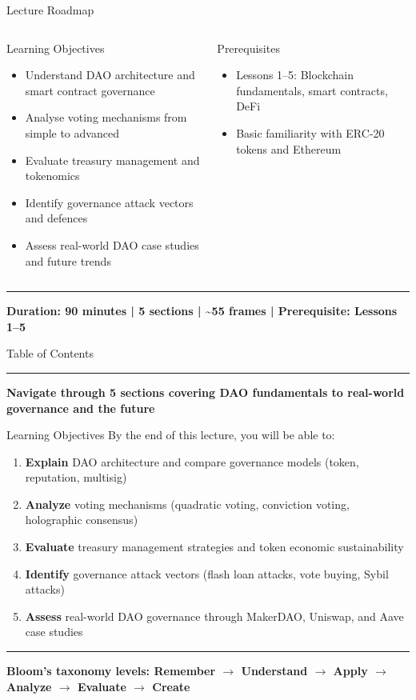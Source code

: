 \documentclass[8pt,aspectratio=169]{beamer}
\newcommand{\bottomnote}[1]{\vfill\vspace{-2mm}\textcolor{mllavender2}{\rule{\textwidth}{0.4pt}}\vspace{1mm}\footnotesize\textbf{#1}}
\begin{document}
\begin{frame}{Lecture Roadmap}
\begin{columns}[T]
\begin{block}{Learning Objectives}
\footnotesize
\begin{itemize}
  \item Understand DAO architecture and smart contract governance
  \item Analyse voting mechanisms from simple to advanced
  \item Evaluate treasury management and tokenomics
  \item Identify governance attack vectors and defences
  \item Assess real-world DAO case studies and future trends
\end{itemize}
\end{block}
\vspace{1mm}
\begin{block}{Prerequisites}
\footnotesize
\begin{itemize}
  \item Lessons 1--5: Blockchain fundamentals, smart contracts, DeFi
  \item Basic familiarity with ERC-20 tokens and Ethereum
\end{itemize}
\end{block}
\end{columns}
\bottomnote{Duration: 90 minutes | 5 sections | \textasciitilde55 frames | Prerequisite: Lessons 1--5}
\end{frame}

\begin{frame}{Table of Contents}
\tableofcontents
\bottomnote{Navigate through 5 sections covering DAO fundamentals to real-world governance and the future}
\end{frame}

\begin{frame}{Learning Objectives}
By the end of this lecture, you will be able to:
\begin{enumerate}
\item \textbf{Explain} DAO architecture and compare governance models (token, reputation, multisig)
\item \textbf{Analyze} voting mechanisms (quadratic voting, conviction voting, holographic consensus)
\item \textbf{Evaluate} treasury management strategies and token economic sustainability
\item \textbf{Identify} governance attack vectors (flash loan attacks, vote buying, Sybil attacks)
\item \textbf{Assess} real-world DAO governance through MakerDAO, Uniswap, and Aave case studies
\end{enumerate}
\bottomnote{Bloom's taxonomy levels: Remember $\rightarrow$ Understand $\rightarrow$ Apply $\rightarrow$ Analyze $\rightarrow$ Evaluate $\rightarrow$ Create}
\end{frame}
\end{document}
